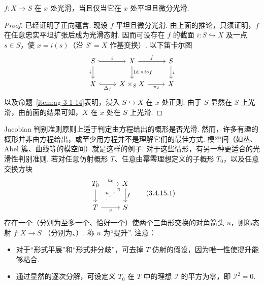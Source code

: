 \begin{corollary}\label{item:ag-3-4-14}
$f:X\longrightarrow S$ 在 $x$ 处光滑，当且仅当它在 $x$ 处平坦且微分光滑.
\end{corollary}
\begin{proof}
已经证明了正向蕴含. 现设 $f$ 平坦且微分光滑. 由上面的推论，只须证明，$f$ 在任意忠实平坦扩张后成为光滑态射. 因而可设存在 $f$ 的截面 $i:S\hookrightarrow X$ 及一点 $s\in S$，使 $x=i(s)$（沿 $S'=X$ 作基变换）. 以下笛卡尔图
\begin{align*}
\begin{tikzcd}[ampersand replacement=\&]
S\arrow[r,hook,"i"]\arrow[d,"i"'] \& X\arrow[r,"f"]\arrow[d,"\operatorname{Id}\times i\circ f"] \& S\arrow[d,"i"]\\
X\arrow[r,hook,"\Delta_f"'] \& X\times_SX\arrow[r,"\pi_2"'] \& X
\end{tikzcd}
\end{align*}
以及命题~\ref{item:ag-3-1-14}表明，浸入 $S\hookrightarrow X$ 在 $x$ 处正则. 由于 $S$ 显然在 $S$ 上光滑，由前面的结果可知，$X$ 在 $x$ 处在 $S$ 上光滑.
\end{proof}\begin{numpara}[光滑性与形式光滑性]\label{item:ag-3-4-15}
Jacobian 判别准则原则上适于判定由方程给出的概形是否光滑. 然而，许多有趣的概形并非由方程给出，或至少用方程并不是理解它们的最佳方式. 模空间（如丛、Abel 簇、曲线等的模空间）就是这样的例子. 对于这些情形，有另一种更适合的光滑性判别准则.
若对任意仿射概形 $T$、任意由幂零理想定义的子概形 $T_0$，以及任意交换方块
\begin{align}
\begin{tikzcd}[ampersand replacement=\&]
T_0\arrow[r,"u_0"]\arrow[d] \& X\arrow[d,"f"]\\
T\arrow[r,"v"']\arrow[ur,dotted,"u"] \& S
\end{tikzcd}\tag{3.4.15.1}\label{eq:ag-3-4-15-1}
\end{align}
存在一个（分别为至多一个、恰好一个）使两个三角形交换的对角箭头 $u$，则称态射 $f:X\longrightarrow S$ （分别为、）. 称 $u$ 为``提升''. 注意：
\begin{itemize}
\item 对于``形式平展''和``形式非分歧''，可去掉 $T$ 仿射的假设，因为唯一性使提升能够粘合.
\item 通过显然的逐次分解，可设定义 $T_0$ 在 $T$ 中的理想 $\mathcal I$ 的平方为零，即 $\mathcal I^2=0$.
\end{itemize}
\end{numpara}
